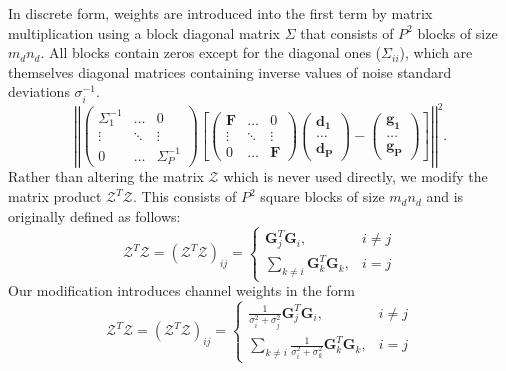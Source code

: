 \documentclass[12pt,notitlepage]{report}
\begin{document}
In discrete form, weights are introduced into the first term by matrix multiplication using a block diagonal matrix $\Sigma$ that consists of $P^2$ blocks of size $m_d n_d$. All blocks contain zeros except for the diagonal ones ($\Sigma_{ii}$), which are themselves diagonal matrices containing inverse values of noise standard deviations $\sigma_i^{-1}$. 
\begin{equation}
\label{eq:srou03_R_ext}
	\left|\left| \begin{pmatrix} \Sigma_1^{-1} & \hdots & 0 \\ \vdots & \ddots & \vdots \\ 0 & \hdots & \Sigma_P^{-1} \end{pmatrix} \left[ \begin{pmatrix} \mathbf{F} & \hdots & 0 \\ \vdots & \ddots & \vdots \\ 0 & \hdots & \mathbf{F} \end{pmatrix}  \begin{pmatrix} \mathbf{d_1} \\ \hdots \\ \mathbf{d_P} \end{pmatrix} - \begin{pmatrix} \mathbf{g_1} \\ \hdots \\ \mathbf{g_P} \end{pmatrix} \right] \right|\right|^2\text{.} 
\end{equation}
Rather than altering the matrix $\mathcal{Z}$ which is never used directly, we modify the matrix product $\mathcal{Z}^T\mathcal{Z}$. This consists of $P^2$ square blocks of size $m_d n_d$ and is originally defined as follows:
\begin{equation}
\label{eq:srou03_R_ext_orig}
	\mathcal{Z}^T\mathcal{Z} = (\mathcal{Z}^T\mathcal{Z})_{ij}  = 
	\begin{cases} 
		\mathbf{G}_j^T\mathbf{G}_i^{}, & i \neq j \\ 
		\sum_{k \neq i}^{}\mathbf{G}_k^T\mathbf{G}_k^{}, & i = j  
	\end{cases}
	\end{equation}
Our modification introduces channel weights in the form
\begin{equation}
\label{eq:srou03_R_ext_new}
	\mathcal{Z}^T\mathcal{Z} = (\mathcal{Z}^T\mathcal{Z})_{ij} = 
	\begin{cases} 
		\frac{1}{\sigma_i^2 + \sigma_j^2}\mathbf{G}_j^T\mathbf{G}_i^{}, & i \neq j \\ 
		\sum_{k \neq i}^{}\frac{1}{\sigma_i^2 + \sigma_k^2}\mathbf{G}_k^T\mathbf{G}_k^{}, & i = j  
	\end{cases}
	\end{equation}
\end{document}
